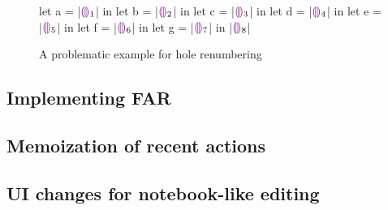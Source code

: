 \begin{figure}
  \centering
  \begin{hminted}
let a = |$\hehole_1$| in
let b = |$\hehole_2$| in
let c = |$\hehole_3$| in
let d = |$\hehole_4$| in
let e = |$\hehole_5$| in
let f = |$\hehole_6$| in
let g = |$\hehole_7$| in
|$\hehole_8$|
  \end{hminted}
  \caption{A problematic example for hole renumbering}
  \label{fig:hole_renumbering_problem}
\end{figure}

\subsection{Implementing FAR}
\label{sec:implementing_far}

\subsection{Memoization of recent actions} 
\label{sec:memoization_actions}

\subsection{UI changes for notebook-like editing}
\label{sec:notebook_ui}

